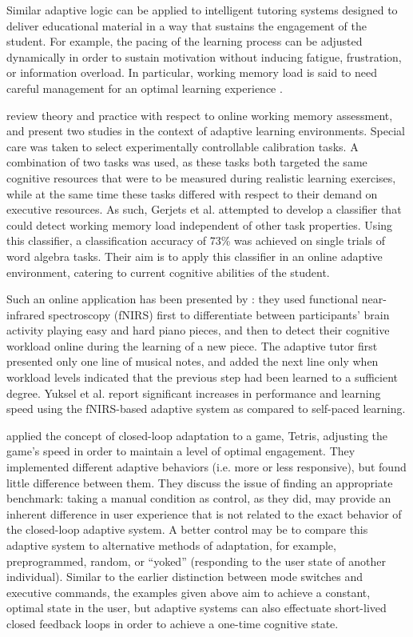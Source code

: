 Similar adaptive logic can be applied to intelligent tutoring systems designed to deliver educational material in a way that sustains the engagement of the student. For example, the pacing of the learning process can be adjusted dynamically in order to sustain motivation without inducing fatigue, frustration, or information overload. In particular, working memory load is said to need careful management for an optimal learning experience \cite{cowan2014workingmemory}.

 review theory and practice with respect to online working memory assessment, and present two studies in the context of adaptive learning environments. Special care was taken to select experimentally controllable calibration tasks. A combination of two tasks was used, as these tasks both targeted the same cognitive resources that were to be measured during realistic learning exercises, while at the same time these tasks differed with respect to their demand on executive resources. As such, Gerjets et al. attempted to develop a classifier that could detect working memory load independent of other task properties. Using this classifier, a classification accuracy of 73\% was achieved on single trials of word algebra tasks. Their aim is to apply this classifier in an online adaptive environment, catering to current cognitive abilities of the student.

Such an online application has been presented by : they used functional near-infrared spectroscopy (fNIRS) first to differentiate between participants' brain activity playing easy and hard piano pieces, and then to detect their cognitive workload online during the learning of a new piece. The adaptive tutor first presented only one line of musical notes, and added the next line only when workload levels indicated that the previous step had been learned to a sufficient degree. Yuksel et al. report significant increases in performance and learning speed using the fNIRS-based adaptive system as compared to self-paced learning. 

 applied the concept of closed-loop adaptation to a game, Tetris, adjusting the game's speed in order to maintain a level of optimal engagement. They implemented different adaptive behaviors (i.e. more or less responsive), but found little difference between them. They discuss the issue of finding an appropriate benchmark: taking a manual condition as control, as they did, may provide an inherent difference in user experience that is not related to the exact behavior of the closed-loop adaptive system. A better control may be to compare this adaptive system to alternative methods of adaptation, for example, preprogrammed, random, or ``yoked'' (responding to the user state of another individual). Similar to the earlier distinction between mode switches and executive commands, the examples given above aim to achieve a constant, optimal state in the user, but adaptive systems can also effectuate short-lived closed feedback loops in order to achieve a one-time cognitive state. 

